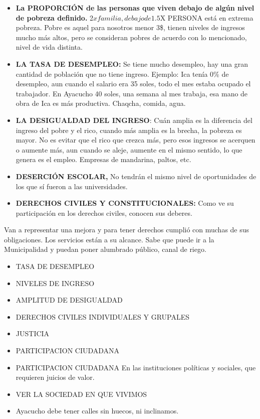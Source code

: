 \documentclass[
  a4paper,
]{article}
\begin{document}
\begin{itemize}
\item
  \textbf{La PROPORCIÓN de las personas que viven debajo de algún nivel
  de pobreza definido.} 2\(x familia, debajo de 1.5\)X PERSONA está en
  extrema pobreza. Pobre es aquel para nosotros menor 3\$, tienen
  niveles de ingresos mucho más altos, pero se consideran pobres de
  acuerdo con lo mencionado, nivel de vida distinta.
\item
  \textbf{LA TASA DE DESEMPLEO:} Se tiene mucho desempleo, hay una gran
  cantidad de población que no tiene ingreso. Ejemplo: Ica tenía 0\% de
  desempleo, aun cuando el salario era 35 soles, todo el mes estaba
  ocupado el trabajador. En Ayacucho 40 soles, una semana al mes
  trabaja, esa mano de obra de Ica es más productiva. Chaqcha, comida,
  agua.
\item
  \textbf{LA DESIGUALDAD DEL INGRESO}: Cuán amplia es la diferencia del
  ingreso del pobre y el rico, cuando más amplia es la brecha, la
  pobreza es mayor. No es evitar que el rico que crezca más, pero esos
  ingresos se acerquen o aumente más, aun cuando se aleje, aumente en el
  mismo sentido, lo que genera es el empleo. Empresas de mandarina,
  paltos, etc.
\item
  \textbf{DESERCIÓN ESCOLAR,} No tendrán el mismo nivel de oportunidades
  de los que sí fueron a las universidades.
\item
  \textbf{DERECHOS CIVILES Y CONSTITUCIONALES:} Como ve su participación
  en los derechos civiles, conocen sus deberes.
\end{itemize}

Van a representar una mejora y para tener derechos cumplió con muchas de
sus obligaciones. Los servicios están a su alcance. Sabe que puede ir a
la Municipalidad y puedan poner alumbrado público, canal de riego.

\begin{itemize}
\item
  TASA DE DESEMPLEO
\item
  NIVELES DE INGRESO
\item
  AMPLITUD DE DESIGUALDAD
\item
  DERECHOS CIVILES INDIVIDUALES Y GRUPALES
\item
  JUSTICIA
\item
  PARTICIPACION CIUDADANA
\item
  PARTICIPACION CIUDADANA En las instituciones políticas y sociales, que
  requieren juicios de valor.
\item
  VER LA SOCIEDAD EN QUE VIVIMOS
\item
  Ayacucho debe tener calles sin huecos, ni inclinamos.
\end{itemize}
\end{document}
